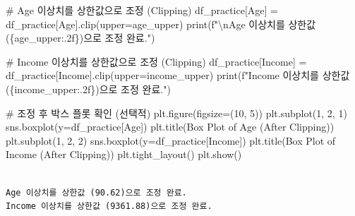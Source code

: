 \documentclass[
  letterpaper,
]{book}
\newenvironment{Shaded}{\begin{snugshade}}{\end{snugshade}}
\newcommand{\BuiltInTok}[1]{\textcolor[rgb]{0.00,0.23,0.31}{#1}}
\newcommand{\CharTok}[1]{\textcolor[rgb]{0.13,0.47,0.30}{#1}}
\newcommand{\CommentTok}[1]{\textcolor[rgb]{0.37,0.37,0.37}{#1}}
\newcommand{\DecValTok}[1]{\textcolor[rgb]{0.68,0.00,0.00}{#1}}
\newcommand{\NormalTok}[1]{\textcolor[rgb]{0.00,0.23,0.31}{#1}}
\newcommand{\OperatorTok}[1]{\textcolor[rgb]{0.37,0.37,0.37}{#1}}
\newcommand{\SpecialCharTok}[1]{\textcolor[rgb]{0.37,0.37,0.37}{#1}}
\newcommand{\SpecialStringTok}[1]{\textcolor[rgb]{0.13,0.47,0.30}{#1}}
\newcommand{\StringTok}[1]{\textcolor[rgb]{0.13,0.47,0.30}{#1}}
\begin{document}
\begin{Shaded}
\begin{Highlighting}[]
\CommentTok{\# Age 이상치를 상한값으로 조정 (Clipping)}
\NormalTok{df\_practice[}\StringTok{\textquotesingle{}Age\textquotesingle{}}\NormalTok{] }\OperatorTok{=}\NormalTok{ df\_practice[}\StringTok{\textquotesingle{}Age\textquotesingle{}}\NormalTok{].clip(upper}\OperatorTok{=}\NormalTok{age\_upper)}
\BuiltInTok{print}\NormalTok{(}\SpecialStringTok{f"}\CharTok{\textbackslash{}n}\SpecialStringTok{Age 이상치를 상한값 (}\SpecialCharTok{\{}\NormalTok{age\_upper}\SpecialCharTok{:.2f\}}\SpecialStringTok{)으로 조정 완료."}\NormalTok{)}

\CommentTok{\# Income 이상치를 상한값으로 조정 (Clipping)}
\NormalTok{df\_practice[}\StringTok{\textquotesingle{}Income\textquotesingle{}}\NormalTok{] }\OperatorTok{=}\NormalTok{ df\_practice[}\StringTok{\textquotesingle{}Income\textquotesingle{}}\NormalTok{].clip(upper}\OperatorTok{=}\NormalTok{income\_upper)}
\BuiltInTok{print}\NormalTok{(}\SpecialStringTok{f"Income 이상치를 상한값 (}\SpecialCharTok{\{}\NormalTok{income\_upper}\SpecialCharTok{:.2f\}}\SpecialStringTok{)으로 조정 완료."}\NormalTok{)}

\CommentTok{\# 조정 후 박스 플롯 확인 (선택적)}
\NormalTok{plt.figure(figsize}\OperatorTok{=}\NormalTok{(}\DecValTok{10}\NormalTok{, }\DecValTok{5}\NormalTok{))}
\NormalTok{plt.subplot(}\DecValTok{1}\NormalTok{, }\DecValTok{2}\NormalTok{, }\DecValTok{1}\NormalTok{)}
\NormalTok{sns.boxplot(y}\OperatorTok{=}\NormalTok{df\_practice[}\StringTok{\textquotesingle{}Age\textquotesingle{}}\NormalTok{])}
\NormalTok{plt.title(}\StringTok{\textquotesingle{}Box Plot of Age (After Clipping)\textquotesingle{}}\NormalTok{)}
\NormalTok{plt.subplot(}\DecValTok{1}\NormalTok{, }\DecValTok{2}\NormalTok{, }\DecValTok{2}\NormalTok{)}
\NormalTok{sns.boxplot(y}\OperatorTok{=}\NormalTok{df\_practice[}\StringTok{\textquotesingle{}Income\textquotesingle{}}\NormalTok{])}
\NormalTok{plt.title(}\StringTok{\textquotesingle{}Box Plot of Income (After Clipping)\textquotesingle{}}\NormalTok{)}
\NormalTok{plt.tight\_layout()}
\NormalTok{plt.show()}
\end{Highlighting}
\end{Shaded}

\begin{verbatim}

Age 이상치를 상한값 (90.62)으로 조정 완료.
Income 이상치를 상한값 (9361.88)으로 조정 완료.
\end{verbatim}
\end{document}
